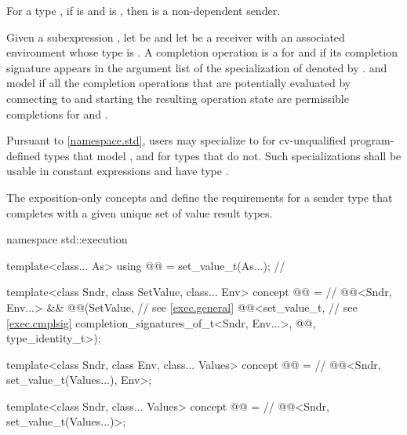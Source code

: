 \pnum
For a type , if
 is  and
 is ,
then  is a non-dependent sender.

\pnum
Given a subexpression ,
let  be  and
let  be a receiver
with an associated environment whose type is .
A completion operation is a 
for  and 
if its completion signature appears in the argument list of the specialization of  denoted by
.
 and  model 
if all the completion operations
that are potentially evaluated by connecting  to  and
starting the resulting operation state
are permissible completions for  and .

\pnum
\remarks
Pursuant to \ref{namespace.std},
users may specialize  to
 for cv-unqualified program-defined types that
model , and
 for types that do not.
Such specializations shall
be usable in constant expressions and
have type .

\pnum
The exposition-only concepts
 and 
define the requirements for a sender type
that completes with a given unique set of value result types.
\begin{codeblock}
namespace std::execution {
  template<class... As>
    using @@ = set_value_t(As...);             // \expos

  template<class Sndr, class SetValue, class... Env>
    concept @@ =                             // \expos
      @@<Sndr, Env...> &&
      @@(SetValue,                                // see \ref{exec.general}
                   @@<set_value_t,           // see \ref{exec.cmplsig}
                                     completion_signatures_of_t<Sndr, Env...>,
                                     @@,
                                     type_identity_t>);

  template<class Sndr, class Env, class... Values>
    concept @@ =                                  // \expos
      @@<Sndr, set_value_t(Values...), Env>;

  template<class Sndr, class... Values>
    concept @@ =                                     // \expos
      @@<Sndr, set_value_t(Values...)>;
}
\end{codeblock}


